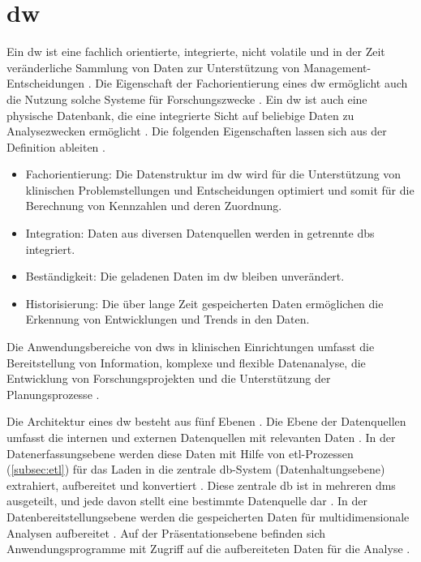 \section{\acl{dw}} \label{sec:dw}

Ein \acf{dw} ist \glqq eine fachlich orientierte, integrierte, nicht volatile und in der Zeit veränderliche Sammlung von Daten zur Unterstützung von Management-Entscheidungen\grqq{} \cite{dworiginal}. Die Eigenschaft der Fachorientierung eines \ac{dw} ermöglicht auch die Nutzung solche Systeme für Forschungszwecke \cite{dwhcliniinv}. Ein \ac{dw} ist auch \glqq eine physische Datenbank, die eine integrierte Sicht auf beliebige Daten zu Analysezwecken ermöglicht\grqq{} \cite{dwgoeken}. Die folgenden Eigenschaften lassen sich aus der Definition ableiten \cite{planungdatawarehouse}.

\begin{itemize}
	\item Fachorientierung: Die Datenstruktur im \ac{dw} wird für die Unterstützung von klinischen Problemstellungen und Entscheidungen optimiert und somit für die Berechnung von Kennzahlen und deren Zuordnung.
	\item Integration: Daten aus diversen Datenquellen werden in getrennte \acp{db} integriert.
	\item Beständigkeit: Die geladenen Daten im \ac{dw} bleiben unverändert.
	\item Historisierung: Die über lange Zeit gespeicherten Daten ermöglichen die Erkennung von Entwicklungen und Trends in den Daten.
\end{itemize}

Die Anwendungsbereiche von \acp{dw} in klinischen Einrichtungen umfasst die Bereitstellung von Information, komplexe und flexible Datenanalyse, die Entwicklung von Forschungsprojekten und die Unterstützung der Planungsprozesse \cite{planungdatawarehouse}.

Die Architektur eines \ac{dw} besteht aus fünf Ebenen \cite{dwbauer}. Die Ebene der Datenquellen umfasst die internen und externen Datenquellen mit relevanten Daten \cite{dwgoeken}. In der Datenerfassungsebene werden diese Daten mit Hilfe von \ac{etl}-Prozessen (\ref{subsec:etl}) für das Laden in die zentrale \ac{db}-System (Datenhaltungsebene) extrahiert, aufbereitet und konvertiert \cite{dworiginal}. Diese zentrale \ac{db} ist in mehreren \acp{dm} ausgeteilt, und jede davon stellt eine bestimmte Datenquelle dar \cite{dwgoeken}. In der Datenbereitstellungsebene werden die gespeicherten Daten für multidimensionale Analysen aufbereitet \cite{dwbauer}. Auf der Präsentationsebene befinden sich Anwendungsprogramme mit Zugriff auf die aufbereiteten Daten für die Analyse \cite{dwtool}.

